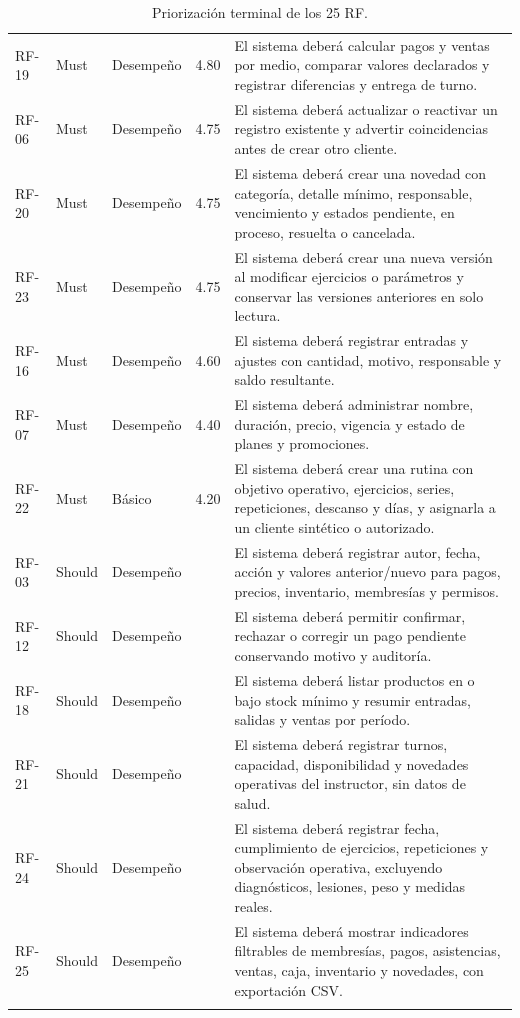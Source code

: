 \documentclass[11pt,a4paper,twoside]{article}
\begin{document}
\begin{longtable}{p{1.8cm}p{1.45cm}p{1.65cm}p{1.0cm}p{7.7cm}}
RF-19 & Must & Desempeño & 4.80 & El sistema deberá calcular pagos y ventas por medio, comparar valores declarados y registrar diferencias y entrega de turno. \\
RF-06 & Must & Desempeño & 4.75 & El sistema deberá actualizar o reactivar un registro existente y advertir coincidencias antes de crear otro cliente. \\
RF-20 & Must & Desempeño & 4.75 & El sistema deberá crear una novedad con categoría, detalle mínimo, responsable, vencimiento y estados pendiente, en proceso, resuelta o cancelada. \\
RF-23 & Must & Desempeño & 4.75 & El sistema deberá crear una nueva versión al modificar ejercicios o parámetros y conservar las versiones anteriores en solo lectura. \\
RF-16 & Must & Desempeño & 4.60 & El sistema deberá registrar entradas y ajustes con cantidad, motivo, responsable y saldo resultante. \\
RF-07 & Must & Desempeño & 4.40 & El sistema deberá administrar nombre, duración, precio, vigencia y estado de planes y promociones. \\
RF-22 & Must & Básico & 4.20 & El sistema deberá crear una rutina con objetivo operativo, ejercicios, series, repeticiones, descanso y días, y asignarla a un cliente sintético o autorizado. \\
RF-03 & Should & Desempeño &  & El sistema deberá registrar autor, fecha, acción y valores anterior/nuevo para pagos, precios, inventario, membresías y permisos. \\
RF-12 & Should & Desempeño &  & El sistema deberá permitir confirmar, rechazar o corregir un pago pendiente conservando motivo y auditoría. \\
RF-18 & Should & Desempeño &  & El sistema deberá listar productos en o bajo stock mínimo y resumir entradas, salidas y ventas por período. \\
RF-21 & Should & Desempeño &  & El sistema deberá registrar turnos, capacidad, disponibilidad y novedades operativas del instructor, sin datos de salud. \\
RF-24 & Should & Desempeño &  & El sistema deberá registrar fecha, cumplimiento de ejercicios, repeticiones y observación operativa, excluyendo diagnósticos, lesiones, peso y medidas reales. \\
RF-25 & Should & Desempeño &  & El sistema deberá mostrar indicadores filtrables de membresías, pagos, asistencias, ventas, caja, inventario y novedades, con exportación CSV. \\
\bottomrule
\caption{Priorización terminal de los 25 RF.}
\end{longtable}
\setlength{\tabcolsep}{6pt}
\normalsize
\end{document}
